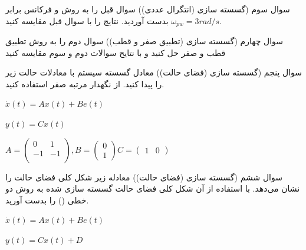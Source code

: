 \documentclass[12pt]{article}
\begin{document}
    \begin{problem}{سوال سوم}
    	(گسسته سازی (انتگرال عددی))
سوال قبل را به روش 
و فرکانس 
برابر 
$\omega_{pw} = 3 rad/s$
بدست آوردید.
نتایج را با سوال قبل مقایسه کنید.
    \end{problem}
    
    
    \begin{problem}{سوال چهارم}
    	(گسسته سازی (تطبیق صفر و قطب)) سوال دوم را به روش تطبیق قطب و صفر حل کنید و با نتایح سوالات دوم و سوم مقایسه کنید
    	
    	
    \end{problem}
    
    \begin{problem}{سوال پنجم}
    	(گسسته سازی (فضای حالت)) معادل گسسته سیستم با معادلات حالت زیر را پیدا کنید.
    	از نگهدار مرتبه صفر استفاده کنید.
    	
    	    	\centering
    	$
    	\dot{x}(t)=Ax(t)+Be(t) 
    	$
    	
    	$
    	y(t)=Cx(t)
    	$
    	
    	$
    		 A=\left( \begin{matrix}
    			0 & 1 \\  
    			-1 & -1 \\ 
    		\end{matrix} \right),B=\left( \begin{matrix}
    			0 \\
    			1  
    		\end{matrix} \right)  
    		 C=\left( \begin{matrix}
    			1 & 0  
    		\end{matrix} \right) 
    	$
    \end{problem}
    
    \begin{problem}{سوال ششم}
    	(گسسته سازی (فضای حالت)) معادله زیر شکل کلی فضای حالت را نشان می‌دهد. با استفاده از آن شکل کلی فضای حالت گسسته سازی شده به روش دو خطی () را بدست آورید.
    
    	\centering
$
    		 \dot{x}(t)=Ax(t)+Be(t) 
$

$
    		 y(t)=Cx(t)+D 
$
    	
	
	
	\end{problem}    
    
\end{document}
